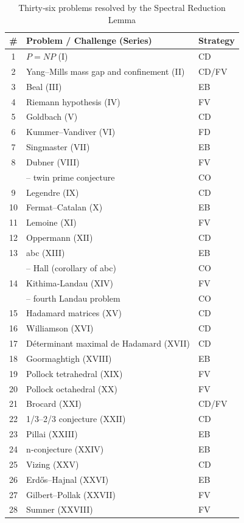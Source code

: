 \documentclass[11pt,a4paper]{article}
\begin{document}
\begin{center}
\small
\begin{longtable}{@{}cll@{}}
\caption{Thirty‑six problems resolved by the Spectral Reduction Lemma}\\
\toprule
\# & Problem / Challenge (Series) & Strategy \\
\midrule
1 & \(P = NP\) (I) & CD \\
2 & Yang–Mills mass gap and confinement (II) & CD/FV \\
3 & Beal (III) & EB \\
4 & Riemann hypothesis (IV) & FV \\
5 & Goldbach (V) & CD \\
6 & Kummer–Vandiver (VI) & FD \\
7 & Singmaster (VII) & EB \\
8 & Dubner (VIII) & FV \\
   & \quad – twin prime conjecture & CO \\
9 & Legendre (IX) & CD \\
10 & Fermat–Catalan (X) & EB \\
11 & Lemoine (XI) & FV \\
12 & Oppermann (XII) & CD \\
13 & abc (XIII) & EB \\
   & \quad – Hall (corollary of abc) & CO \\
14 & Kithima‑Landau (XIV) & FV \\
    & \quad – fourth Landau problem & CO \\
15 & Hadamard matrices (XV) & CD \\
16 & Williamson (XVI) & CD \\
17 & Déterminant maximal de Hadamard (XVII) & CD \\
18 & Goormaghtigh (XVIII) & EB \\
19 & Pollock tetrahedral (XIX) & FV \\
20 & Pollock octahedral (XX) & FV \\
21 & Brocard (XXI) & CD/FV \\
22 & 1/3–2/3 conjecture (XXII) & CD \\
23 & Pillai (XXIII) & EB \\
24 & n‑conjecture (XXIV) & EB \\
25 & Vizing (XXV) & CD \\
26 & Erdős–Hajnal (XXVI) & EB \\
27 & Gilbert–Pollak (XXVII) & FV \\
28 & Sumner (XXVIII) & FV \\

\end{longtable}
\end{center}
\end{document}
